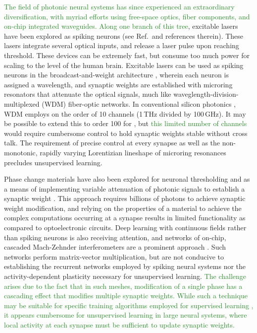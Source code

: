 \documentclass[twocolumn]{article}
\newcommand{\onlinecite}[1]{\hspace{-1 ex} \nocite{#1}\citenum{#1}}
\begin{document}
\textcolor{ForestGreen}{The field of photonic neural systems has since experienced an extraordinary diversification, with myriad efforts using free-space optics, fiber components, and on-chip integrated waveguides. Along one branch of this tree}, excitable lasers have been explored as spiking neurons (see Ref.\,\onlinecite{prsh2017} and references therein). These lasers integrate several optical inputs, and release a laser pulse upon reaching threshold. These devices can be extremely fast, but consume too much power for scaling to the level of the human brain. Excitable lasers can be used as spiking neurons in the broadcast-and-weight architecture \cite{tana20142}, wherein each neuron is assigned a wavelength, and synaptic weights are established with microring resonators that attenuate the optical signals, much like  waveglength-division-multiplexed (WDM) fiber-optic networks. In conventional silicon photonics \textcolor{ForestGreen}{\cite{li2005}}, WDM employs on the order of 10 channels (1\,THz divided by 100\,GHz). It may be possible to extend this to order 100 for \cite{prsh2011,tana20142}, but \textcolor{ForestGreen}{this limited number of channels} would require cumbersome control to hold synaptic weights stable without cross talk. The requirement of precise control at every synapse as well as the non-monotonic, rapidly varying Lorentizian lineshape of microring resonances precludes unsupervised learning. 

Phase change materials have also been explored for neuronal thresholding \cite{chsa2018} and as a means of implementing variable attenuation of photonic signals to establish a synaptic weight \cite{chri2017}. This approach requires billions of photons to achieve synaptic weight modification, and relying on the properties of a material to achieve the complex computations occurring at a synapse results in limited functionality as compared to optoelectronic circuits. Deep learning with continuous fields rather than spiking neurons is also receiving attention, and networks of on-chip, cascaded Mach-Zehnder interferometers are a prominent approach \cite{shha2016}. Such networks perform matrix-vector multiplication, but are not conducive to establishing the recurrent networks employed by spiking neural systems nor the activity-dependent plasticity necessary for unsupervised learning. \textcolor{ForestGreen}{The challenge arises due to the fact that in such meshes, modification of a single phase has a cascading effect that modifies multiple synaptic weights. While such a technique may be suitable for specific training algorithms employed for supervised learning \cite{humi2018}, it appears cumbersome for unsupervised learning in large neural systems, where local activity at each synapse must be sufficient to update synaptic weights.}
\end{document}
